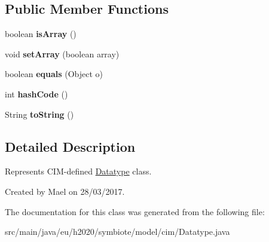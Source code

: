 \subsection*{Public Member Functions}
\begin{DoxyCompactItemize}
\item 
\mbox{\label{classeu_1_1h2020_1_1symbiote_1_1model_1_1cim_1_1Datatype_aa6a82c2f622b7b6389d71afecf86b415}} 
boolean {\bfseries is\+Array} ()
\item 
\mbox{\label{classeu_1_1h2020_1_1symbiote_1_1model_1_1cim_1_1Datatype_a53e70b3185338eef376ff528888964dd}} 
void {\bfseries set\+Array} (boolean array)
\item 
\mbox{\label{classeu_1_1h2020_1_1symbiote_1_1model_1_1cim_1_1Datatype_a8808de68d28113c0ba02cb638fec1cbe}} 
boolean {\bfseries equals} (Object o)
\item 
\mbox{\label{classeu_1_1h2020_1_1symbiote_1_1model_1_1cim_1_1Datatype_a3db79d7a284c39f12c469af1adf0ffc7}} 
int {\bfseries hash\+Code} ()
\item 
\mbox{\label{classeu_1_1h2020_1_1symbiote_1_1model_1_1cim_1_1Datatype_aa0f820f0ec21543e9ef9cda658cb8244}} 
String {\bfseries to\+String} ()
\end{DoxyCompactItemize}


\subsection{Detailed Description}
Represents C\+I\+M-\/defined \hyperlink{classeu_1_1h2020_1_1symbiote_1_1model_1_1cim_1_1Datatype}{Datatype} class.

Created by Mael on 28/03/2017. 

The documentation for this class was generated from the following file\+:\begin{DoxyCompactItemize}
\item 
src/main/java/eu/h2020/symbiote/model/cim/Datatype.\+java\end{DoxyCompactItemize}
